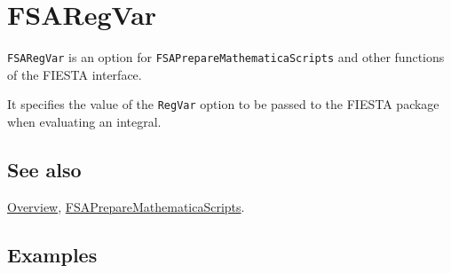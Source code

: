 \documentclass[../FeynHelpersManual.tex]{subfiles}
\begin{document}
\begin{Shaded}
\begin{Highlighting}[]
 
\end{Highlighting}
\end{Shaded}

\hypertarget{fsaregvar}{
\section{FSARegVar}\label{fsaregvar}}

\texttt{FSARegVar} is an option for
\texttt{FSAPrepareMathematicaScripts} and other functions of the FIESTA
interface.

It specifies the value of the \texttt{RegVar} option to be passed to the
FIESTA package when evaluating an integral.

\subsection{See also}

\hyperlink{toc}{Overview},
\hyperlink{fsapreparemathematicascripts}{FSAPrepareMathematicaScripts}.

\subsection{Examples}
\end{document}
